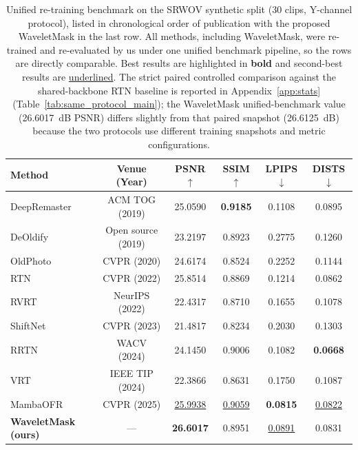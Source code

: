 {\begin{table}[H]
\caption{Unified re-training benchmark on the SRWOV synthetic split (30 clips, Y-channel protocol), listed in chronological order of publication with the proposed WaveletMask in the last row. All methods, including WaveletMask, were re-trained and re-evaluated by us under one unified benchmark pipeline, so the rows are directly comparable. Best results are highlighted in \textbf{bold} and second-best results are \underline{underlined}. The strict paired controlled comparison against the shared-backbone RTN baseline is reported in Appendix~\ref{app:stats} (Table~\ref{tab:same_protocol_main}); the WaveletMask unified-benchmark value (26.6017~dB PSNR) differs slightly from that paired snapshot (26.6125~dB) because the two protocols use different training snapshots and metric configurations.\label{tab:literature_context}}
\footnotesize
\begin{tabularx}{\textwidth}{lcCCCC}
\toprule
\textbf{Method} & \textbf{Venue (Year)} & \textbf{PSNR$\uparrow$} & \textbf{SSIM$\uparrow$} & \textbf{LPIPS$\downarrow$} & \textbf{DISTS$\downarrow$} \\
\midrule
DeepRemaster~\cite{iizuka2019deepremaster}  & ACM TOG (2019) & 25.0590 & \textbf{0.9185} & 0.1108 & 0.0895 \\
DeOldify~\cite{jantic2019deoldify}          & Open source (2019) & 23.2197 & 0.8923 & 0.2775 & 0.1260 \\
OldPhoto~\cite{wan2020bringing}             & CVPR (2020) & 24.6174 & 0.8524 & 0.2252 & 0.1144 \\
RTN~\cite{rtn2022}                          & CVPR (2022) & 25.8514 & 0.8869 & 0.1214 & 0.0862 \\
RVRT~\cite{liang2022rvrt}                   & NeurIPS (2022) & 22.4317 & 0.8710 & 0.1655 & 0.1078 \\
ShiftNet~\cite{li2023shiftnet}              & CVPR (2023) & 21.4817 & 0.8234 & 0.2030 & 0.1303 \\
RRTN~\cite{rrtn2024}                        & WACV (2024) & 24.1450 & 0.9006 & 0.1082 & \textbf{0.0668} \\
VRT~\cite{liang2024vrt}                     & IEEE TIP (2024) & 22.3866 & 0.8631 & 0.1750 & 0.1087 \\
MambaOFR~\cite{mao2025mambaofr}             & CVPR (2025) & \underline{25.9938} & \underline{0.9059} & \textbf{0.0815} & \underline{0.0822} \\
\midrule
\textbf{WaveletMask (ours)}                 & ---                 & \textbf{26.6017} & 0.8951 & \underline{0.0891} & 0.0831 \\
\bottomrule
\end{tabularx}
\normalsize
\end{table}

}
